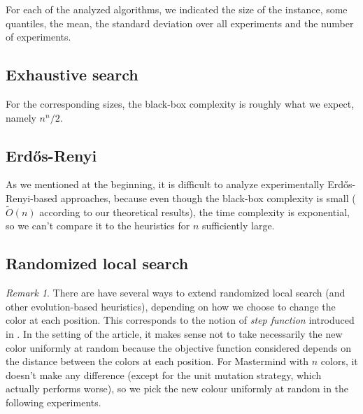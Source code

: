 \documentclass[12pt]{article}
\theoremstyle{definition}
\theoremstyle{plain}
\theoremstyle{remark}
\newtheorem*{remark}{Remark}
\begin{document}
For each of the analyzed algorithms, we indicated the size of the instance, some quantiles, the mean, the standard deviation
over all experiments and the number of experiments.

\subsection{Exhaustive search}


For the corresponding sizes, the black-box complexity is roughly what we expect, namely $n^n/2$.

\subsection{Erd\H{o}s-Renyi}


As we mentioned at the beginning, it is difficult to analyze experimentally Erd\H{o}s-Renyi-based
approaches, because even though the black-box complexity is small ($\tilde{O}(n)$ according to our
theoretical results), the time complexity is exponential, so we can't compare it to the
heuristics for $n$ sufficiently large.

\subsection{Randomized local search}

\begin{remark}
There are have several ways to extend randomized local search (and other evolution-based heuristics),
depending on how we choose to change the color at each position. This corresponds to the notion of
\textit{step function} introduced in \cite{KOTZING}. In the setting of the article, it makes sense
not to take necessarily the new color uniformly at random because the objective function considered
depends on the distance between the colors at each position. For Mastermind with $n$ colors, it doesn't
make any difference (except for the unit mutation strategy, which actually performs worse), so we
pick the new colour uniformly at random in the following experiments.
\end{remark}

\end{document}
